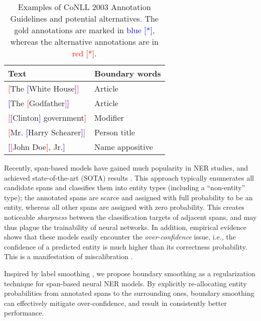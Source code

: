 \documentclass[11pt]{article}
\begin{document}
\begin{table}[t]
    \centering \small
    \begin{tabular}{ll}
        \toprule
        Text & Boundary words \\
        \midrule
        \textcolor{red}{[}The \textcolor{blue}{[}White House\textcolor{blue}{]}\textcolor{red}{]} & Article \\
        \midrule
        \textcolor{blue}{[}The \textcolor{red}{[}Godfather\textcolor{red}{]}\textcolor{blue}{]} & Article \\
        \midrule
        \textcolor{red}{[}\textcolor{blue}{[}Clinton\textcolor{blue}{]} government\textcolor{red}{]} & Modifier \\
        \midrule
        \textcolor{red}{[}Mr. \textcolor{blue}{[}Harry Schearer\textcolor{blue}{]}\textcolor{red}{]} & Person title \\
        \midrule
        \textcolor{blue}{[}\textcolor{red}{[}John Doe\textcolor{red}{]}, Jr.\textcolor{blue}{]} & Name appositive \\
        \bottomrule
    \end{tabular}
    \caption{Examples of CoNLL 2003 Annotation Guidelines and potential alternatives. The gold annotations are marked in \textcolor{blue}{blue [*]}, whereas the alternative annotations are in \textcolor{red}{red [*]}.}
    \label{tab:conll2003-examples}
\end{table}

Recently, span-based models have gained much popularity in NER studies, and achieved state-of-the-art (SOTA) results \citep{eberts2019span,yu-etal-2020-named,li-etal-2021-span}. This approach typically enumerates all candidate spans and classifies them into entity types (including a ``non-entity'' type); the annotated spans are scarce and assigned with full probability to be an entity, whereas all other spans are assigned with zero probability. This creates noticeable \emph{sharpness} between the classification targets of adjacent spans, and may thus plague the trainability of neural networks. In addition, empirical evidence shows that these models easily encounter the \emph{over-confidence} issue, i.e., the confidence of a predicted entity is much higher than its correctness probability. This is a manifestation of miscalibration \citep{guo2017calibration}. 

Inspired by label smoothing \citep{szegedy2016rethinking,muller2019when}, we propose boundary smoothing as a regularization technique for span-based neural NER models. By explicitly re-allocating entity probabilities from annotated spans to the surrounding ones, boundary smoothing can effectively mitigate over-confidence, and result in consistently better performance. 
\end{document}
